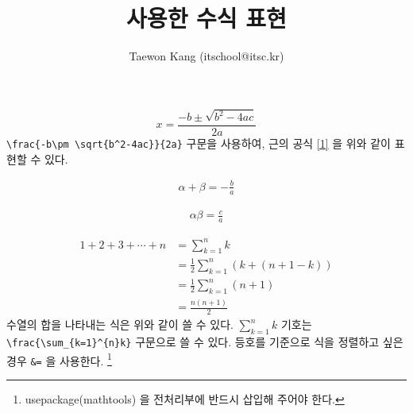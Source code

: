 \documentclass{oblivoir}
\author{Taewon Kang (itschool@itsc.kr)}
\title{\TeX를 사용한 수식 표현}
\begin{document}
	\maketitle
		\begin{equation} 
			x = \frac{-b\pm \sqrt{b^2-4ac}}{2a} \label{1}
		\end{equation}
		 \verb|\frac{-b\pm \sqrt{b^2-4ac}}{2a}| 구문을 사용하여, 근의 공식 \ref{1} 을 위와 같이 표현할 수 있다.
		
		\begin{equation}
			\begin{gathered}
				\alpha + \beta = -\frac{b}{a} \label{2}
			\end{gathered}
		\end{equation}	
			
		\begin{equation}
			\begin{gathered}
				\alpha \beta = \frac{c}{a} \label{3}
			\end{gathered}
		\end{equation}
		
		\begin{align} %
			1 + 2 + 3 + \cdots + n &= \sum_{k=1}^{n}k \nonumber \\
			&= \frac{1}{2}\sum_{k=1}^{n}(k+(n+1-k)) \nonumber \\
			&= \frac{1}{2}\sum_{k=1}^{n}(n+1) \nonumber \\
			&= \frac{n(n+1)}{2}
		\end{align}
		 수열의 합을 나타내는 식은 위와 같이 쓸 수 있다. $\sum_{k=1}^{n}k$ 기호는 \verb|\frac{\sum_{k=1}^{n}k}| 구문으로 쓸 수 있다. 등호를 기준으로 식을 정렬하고 싶은 경우 \verb|&=| 을 사용한다. 
\footnote{usepackage(mathtools) 을 전처리부에 반드시 삽입해 주어야 한다.}

\vspace{10pt} 
\end{document}
